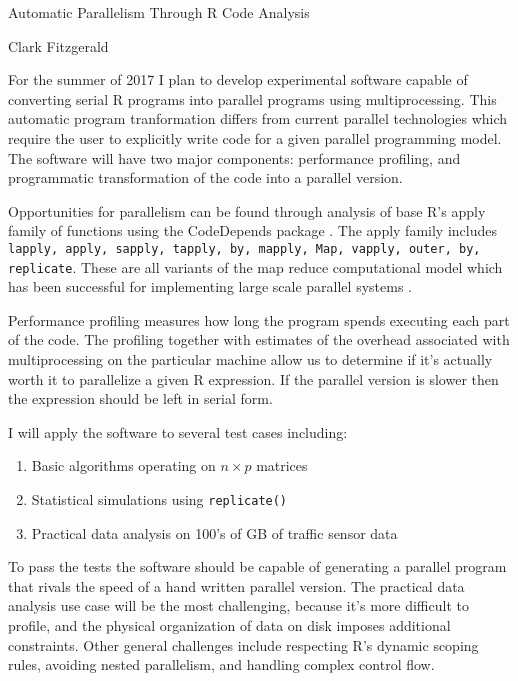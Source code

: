 \documentclass[12pt]{article}
\begin{document}
\begin{center}
    \large Automatic Parallelism Through R Code Analysis 

    \normalsize Clark Fitzgerald
\end{center}

\hfill

For the summer of 2017 I plan to develop experimental software capable of
converting serial R programs into parallel programs using multiprocessing.
This automatic program tranformation differs from current parallel
technologies which require the user to explicitly write code for a given
parallel programming model. The software will have two major components:
performance profiling, and programmatic transformation of the code into a
parallel version.


Opportunities for parallelism can be found through analysis of base R's
apply family of functions using the CodeDepends package
\cite{R-CodeDepends}. The apply family includes \texttt{lapply, apply, sapply,
tapply, by, mapply, Map, vapply, outer, by, replicate}. These are all
variants of the map reduce computational model which has
been successful for implementing large scale parallel systems
\cite{dean2008mapreduce}. 

Performance profiling measures how long the program spends executing each
part of the code. The profiling together with estimates of the overhead
associated with multiprocessing on the particular machine allow us to
determine if it's actually worth it to parallelize a given R expression.
If the parallel version is slower then the expression should
be left in serial form.

I will apply the software to several test cases including:
\begin{enumerate}
    \item Basic algorithms operating on $n \times p$ matrices
    \item Statistical simulations using \texttt{replicate()}
    \item Practical data analysis on 100's of GB of traffic sensor data 
\end{enumerate}
To pass the tests the software should be capable of generating a parallel
program that rivals the speed of a hand written parallel version. The
practical data analysis use case will be the most challenging, because it's
more difficult to profile, and the physical organization of data on disk
imposes additional constraints.
Other general challenges include respecting R's dynamic scoping rules,
avoiding nested parallelism, and handling complex control flow.
\end{document}
